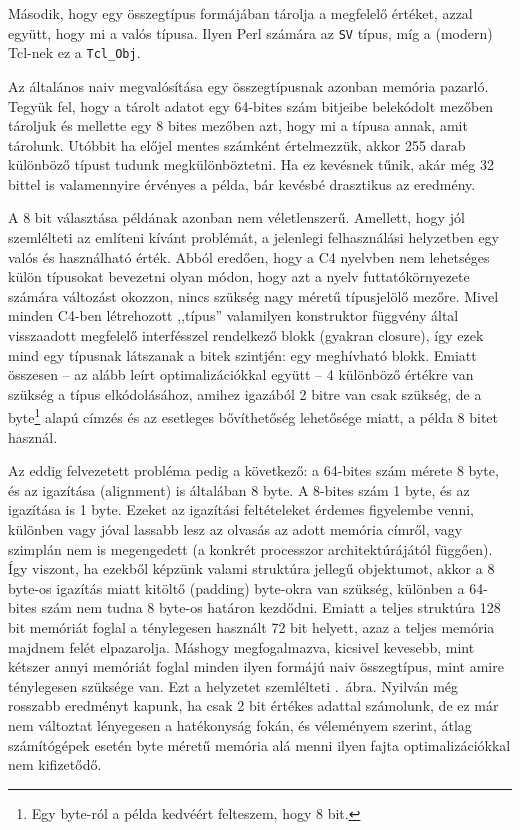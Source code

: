Második, hogy egy összegtípus formájában tárolja a megfelelő értéket, azzal együtt, hogy mi a valós típusa.
Ilyen Perl számára az {\tt SV} típus, míg a (modern) Tcl-nek ez a {\tt Tcl\_Obj}.

Az általános naiv megvalósítása egy összegtípusnak azonban memória pazarló.
Tegyük fel, hogy a tárolt adatot egy 64-bites szám bitjeibe belekódolt mezőben tároljuk és mellette egy 8 bites mezőben azt, hogy mi a típusa annak, amit tárolunk.
Utóbbit ha előjel mentes számként értelmezzük, akkor 255 darab különböző típust tudunk megkülönböztetni.
Ha ez kevésnek tűnik, akár még 32 bittel is valamennyire érvényes a példa, bár kevésbé drasztikus az eredmény.

A 8 bit választása példának azonban nem véletlenszerű.
Amellett, hogy jól szemlélteti az említeni kívánt problémát, a jelenlegi felhasználási helyzetben egy valós és használható érték.
Abból eredően, hogy a C4 nyelvben nem lehetséges külön típusokat bevezetni olyan módon, hogy azt a nyelv futtatókörnyezete számára változást okozzon, nincs szükség nagy méretű típusjelölő mezőre.
Mivel minden C4-ben létrehozott ,,típus'' valamilyen konstruktor függvény által visszaadott megfelelő interfésszel rendelkező blokk (gyakran closure), így ezek mind egy típusnak látszanak a bitek szintjén: egy meghívható blokk.
Emiatt összesen -- az alább leírt optimalizációkkal együtt -- 4 különböző értékre van szükség a típus elkódolásához, amihez igazából 2 bitre van csak szükség, de a byte\footnote{Egy byte-ról a példa kedvéért felteszem, hogy 8 bit.} alapú címzés és az esetleges bővíthetőség lehetősége miatt, a példa 8 bitet használ.

Az eddig felvezetett probléma pedig a következő: a 64-bites szám mérete 8 byte, és az igazítása (alignment) is általában 8 byte.
A 8-bites szám 1 byte, és az igazítása is 1 byte.
Ezeket az igazítási feltételeket érdemes figyelembe venni, különben vagy jóval lassabb lesz az olvasás az adott memória címről, vagy szimplán nem is megengedett (a konkrét processzor architektúrájától függően).
Így viszont, ha ezekből képzünk valami struktúra jellegű objektumot, akkor a 8 byte-os igazítás miatt kitöltő (padding) byte-okra van szükség, különben a 64-bites szám nem tudna 8 byte-os határon kezdődni.
Emiatt a teljes struktúra 128 bit memóriát foglal a ténylegesen használt 72 bit helyett, azaz a teljes memória majdnem felét elpazarolja.
Máshogy megfogalmazva, kicsivel kevesebb, mint kétszer annyi memóriát foglal minden ilyen formájú naiv összegtípus, mint amire ténylegesen szüksége van.
Ezt a helyzetet szemlélteti .~ábra.
Nyilván még rosszabb eredményt kapunk, ha csak 2 bit értékes adattal számolunk, de ez már nem változtat lényegesen a hatékonyság fokán, és véleményem szerint, átlag számítógépek esetén byte méretű memória alá menni ilyen fajta optimalizációkkal nem kifizetődő.

